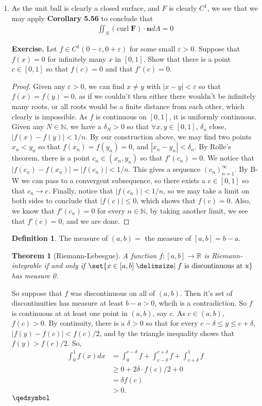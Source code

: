 \documentclass[12pt]{article}
\def\mbb#1{\mathbb{#1}}
\def\bN{\mbb{N}}
\newtheorem{theorem}{Theorem}[section]
\theoremstyle{definition}
\newtheorem{definition}{Definition}[section]
\theoremstyle{remark}
\newcommand{\R}{\mathbb{R}}
\newcommand{\ve}{\varepsilon}
\renewcommand{\qed}{\hfill\qedsymbol}
\begin{document}
\begin{enumerate}[leftmargin=\labelsep]
		\item 
		As the unit ball is clearly a closed surface, and $F$ is clearly $C^1$, we see that we may apply \textbf{Corollary 5.56} to conclude that
		\begin{align*}
			\iint_S (\mathrm{curl}\; \textbf{F}) \cdot \textbf{n}dA = 0
		\end{align*}
	
		\textbf{Exercise.} Let $f \in C^1(0-\ve, 0+\ve)$ for some small $\ve > 0$. Suppose that $f(x) = 0$ for infinitely many $x$ in $[0, 1]$. Show that there is a point $c \in [0, 1]$ so that $f(c) = 0$ and that $f'(c) = 0$.
		
		\begin{proof}
			Given any $\ve > 0$, we can find $x \neq y$ with $|x-y|<\ve$ so that $f(x)=f(y)=0$, as if we couldn't then either there wouldn't be infinitely many roots, or all roots would be a finite distance from each other, which clearly is impossible. As $f$ is continuous on $[0, 1]$, it is uniformly continuous. Given any $N \in \bN$, we have a $\delta_N > 0$ so that $\forall x, y \in [0, 1]$, $\delta_n$ close, $|f(x)-f(y)| < 1/n$. By our construction above, we may find two points $x_n<y_n$ so that $f(x_n)=f(y_n)=0$, and $|x_n-y_n| < \delta_n$. By Rolle's theorem, there is a point $c_n \in (x_n, y_n)$ so that $f'(c_n) = 0$. We notice that $|f(c_n) - f(x_n)| = |f(c_n)| < 1/n$. This gives a sequence $(c_n)_{n=1}^\infty$. By B-W we can pass to a convergent subsequence, so there exists a $c \in [0, 1]$ so that $c_n \to c$. Finally, notice that $|f(c_n)| < 1/n$, so we may take a limit on both sides to conclude that $|f(c)| \leq 0$, which shows that $f(c) = 0$. Also, we know that $f'(c_n) = 0$ for every $n \in \bN$, by taking another limit, we see that $f'(c) = 0$, and we are done.
		\end{proof}
	
		\begin{definition}
			The measure of $(a, b) =$ the measure of $[a,b]=b-a$.
		\end{definition}
		\begin{theorem}[Riemann-Lebesgue]
			A function $f: [a, b] \to \R$ is Riemann-integrable if and only if $\set{x \in [a, b] \given f \text{ is discontinuous at x}}$ has measure 0.
		\end{theorem}
		So suppose that $f$ was discontinuous on all of $(a, b)$. Then it's set of discontinuities has measure at least $b-a>0$, whcih is a contradiction. So $f$ is continuous at at least one point in $(a, b)$, say $c$. As $c \in (a, b)$, $f(c) > 0$. By continuity, there is a $\delta > 0$ so that for every $c - \delta \leq y \leq c + \delta$, $|f(y)-f(c)| < f(c)/2$, and by the triangle inequality shows that $f(y) > f(c)/2$. So,
		\begin{align*}
			\int_0^1 f(x)dx &= \int_0^{c-\delta} f + \int_{c-\delta}^{c+\delta} f + \int_{c+\delta}^1 f \\
			&\geq 0 + 2 \delta \cdot f(c)/2 + 0 \\
			&= \delta f(c) \\
			&> 0 .
		\end{align*}
	$\qed$
	\end{enumerate}
\end{document}
